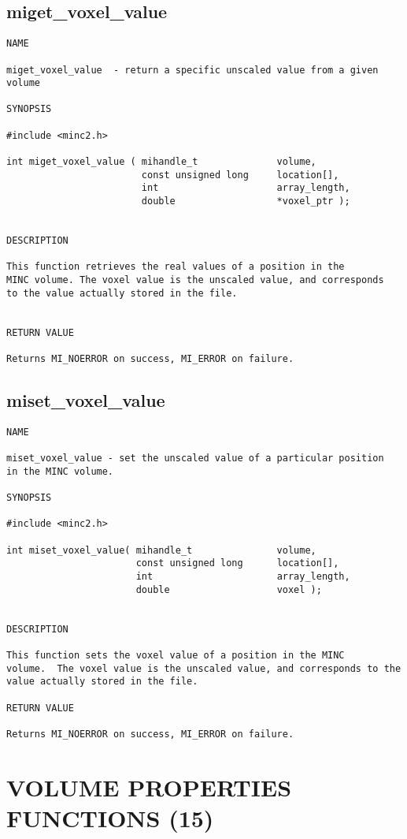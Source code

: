 \documentclass{article}
\begin{document}
\subsection{miget\_voxel\_value}
\begin{verbatim}
NAME

miget_voxel_value  - return a specific unscaled value from a given volume

SYNOPSIS

#include <minc2.h>

int miget_voxel_value ( mihandle_t              volume,
                        const unsigned long     location[],
                        int                     array_length,
                        double                  *voxel_ptr );


DESCRIPTION

This function retrieves the real values of a position in the
MINC volume. The voxel value is the unscaled value, and corresponds
to the value actually stored in the file.


RETURN VALUE

Returns MI_NOERROR on success, MI_ERROR on failure.
\end{verbatim}

\subsection{miset\_voxel\_value}
\begin{verbatim}
NAME

miset_voxel_value - set the unscaled value of a particular position
in the MINC volume.

SYNOPSIS

#include <minc2.h>

int miset_voxel_value( mihandle_t               volume,
                       const unsigned long      location[],
                       int                      array_length,
                       double                   voxel );


DESCRIPTION

This function sets the voxel value of a position in the MINC
volume.  The voxel value is the unscaled value, and corresponds to the
value actually stored in the file.

RETURN VALUE

Returns MI_NOERROR on success, MI_ERROR on failure.
\end{verbatim}

\section{VOLUME PROPERTIES FUNCTIONS (15)}
\end{document}
